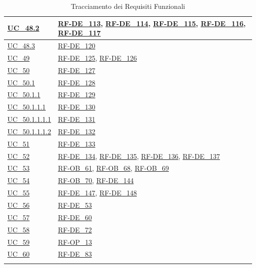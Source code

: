 \begin{longtable}{|
        >{\raggedright\arraybackslash}p{} |
        >{\raggedright\arraybackslash}p{} |
    }
    \hline
    \hyperref[uc_48.2]{UC\_48.2} & \hyperlink{rf-de_113}{RF-DE\_113}, \hyperlink{rf-de_114}{RF-DE\_114}, \hyperlink{rf-de_115}{RF-DE\_115}, \hyperlink{rf-de_116}{RF-DE\_116}, \hyperlink{rf-de_117}{RF-DE\_117} \\
    \hline
    \hyperref[uc_48.3]{UC\_48.3} & \hyperlink{rf-de_120}{RF-DE\_120} \\
    \hline
    \hyperref[uc_49]{UC\_49} & \hyperlink{rf-de_125}{RF-DE\_125}, \hyperlink{rf-de_126}{RF-DE\_126} \\
    \hline
    \hyperref[uc_50]{UC\_50} & \hyperlink{rf-de_127}{RF-DE\_127} \\
    \hline
    \hyperref[uc_50.1]{UC\_50.1} & \hyperlink{rf-de_128}{RF-DE\_128} \\
    \hline
    \hyperref[uc_50.1.1]{UC\_50.1.1} & \hyperlink{rf-de_129}{RF-DE\_129} \\
    \hline
    \hyperref[uc_50.1.1.1]{UC\_50.1.1.1} & \hyperlink{rf-de_130}{RF-DE\_130} \\
    \hline
    \hyperref[uc_50.1.1.1.1]{UC\_50.1.1.1.1} & \hyperlink{rf-de_131}{RF-DE\_131} \\
    \hline
    \hyperref[uc_50.1.1.1.2]{UC\_50.1.1.1.2} & \hyperlink{rf-de_132}{RF-DE\_132} \\
    \hline
    \hyperref[uc_51]{UC\_51} & \hyperlink{rf-de_133}{RF-DE\_133} \\
    \hline
    \hyperref[uc_52]{UC\_52} & \hyperlink{rf-de_134}{RF-DE\_134}, \hyperlink{rf-de_135}{RF-DE\_135}, \hyperlink{rf-de_136}{RF-DE\_136}, \hyperlink{rf-de_137}{RF-DE\_137} \\
    \hline
    \hyperref[uc_53]{UC\_53} & \hyperlink{rf-ob_61}{RF-OB\_61}, \hyperlink{rf-ob_68}{RF-OB\_68}, \hyperlink{rf-ob_69}{RF-OB\_69} \\
    \hline
    \hyperref[uc_54]{UC\_54} & \hyperlink{rf-ob_70}{RF-OB\_70}, \hyperlink{rf-de_144}{RF-DE\_144} \\
    \hline
    \hyperref[uc_55]{UC\_55} & \hyperlink{rf-de_147}{RF-DE\_147}, \hyperlink{rf-de_148}{RF-DE\_148} \\
    \hline
    \hyperref[uc_56]{UC\_56} & \hyperlink{rf-de_53}{RF-DE\_53} \\
    \hline
    \hyperref[uc_57]{UC\_57} & \hyperlink{rf-de_60}{RF-DE\_60} \\
    \hline
    \hyperref[uc_58]{UC\_58} & \hyperlink{rf-de_72}{RF-DE\_72} \\
    \hline
    \hyperref[uc_59]{UC\_59} & \hyperlink{rf-op_13}{RF-OP\_13} \\
    \hline
    \hyperref[uc_60]{UC\_60} & \hyperlink{rf-de_83}{RF-DE\_83} \\
    \hline
    \caption{Tracciamento dei Requisiti Funzionali}
    \label{tab:tracciamento}
\end{longtable}
